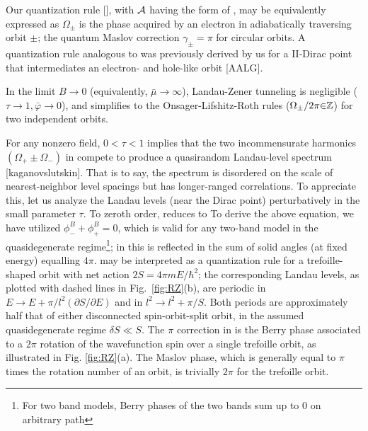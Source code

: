 \documentclass[aps, prb, showpacs, twocolumn, notitlepage, superscriptaddress]{revtex4-1}
\begin{document}
Our quantization rule [], with ${\cal A}$ having the form of , may be equivalently expressed as
$\Omega_{\pm}$ is the phase acquired by an electron in adiabatically traversing orbit $\pm$; the quantum Maslov correction $\gamma_{\pm}{=}\pi$ for circular orbits.  A quantization rule analogous to  was previously derived by us for a II-Dirac point that intermediates an electron- and hole-like orbit [AALG]. 


In the limit $B{\rightarrow}0$ (equivalently, $\bar{\mu}{\rightarrow} \infty$), Landau-Zener tunneling is negligible ($\tau{\rightarrow}1,\bar{\varphi}{\rightarrow}0$), and  simplifies to the Onsager-Lifshitz-Roth rules ($\Omega_{\pm}/2\pi{\in}\mathbb{Z}$) for  two independent orbits.

For any nonzero field, $0{<}\tau{<}1$ implies that the two incommensurate harmonics $(\Omega_+{\pm}\Omega_-)$ in  compete to produce a quasirandom Landau-level spectrum [kaganovslutskin]. That is to say, the spectrum is disordered on the scale of nearest-neighbor level spacings but has longer-ranged correlations. To appreciate this, let us analyze the Landau levels (near the Dirac point) perturbatively in the small parameter $\tau$. To zeroth order,  reduces to
To derive the above equation, we have utilized $\phi^B_-{+}\phi^B_+{=}0$, which is valid for any two-band model in the quasidegenerate regime\footnote{For two band models, Berry phases of the two bands sum up to 0 on arbitrary path}; in  this is reflected in the sum of solid angles (at fixed energy) equalling $4\pi$.  may be interpreted as a quantization rule for a trefoille-shaped orbit with net action $2S{=}4\pi m E{/\hbar^2}$; the corresponding Landau levels, as plotted with dashed lines in Fig.\ \ref{fig:RZ}(b), are  periodic in $E{\rightarrow}E{+}\pi/l^2(\partial S/\partial E)$ and in $l^2{\rightarrow}l^2{+}\pi/S$. Both periods are approximately half that of either disconnected spin-orbit-split orbit, in the assumed quasidegenerate regime $\delta S{\ll}S$. The $\pi$ correction in  is the Berry phase associated to a $2\pi$ rotation of the wavefunction spin over a single trefoille orbit, as illustrated in Fig. \ref{fig:RZ}(a). The Maslov phase, which is generally equal to $\pi$ times the rotation number of an orbit, is trivially $2\pi$ for the trefoille orbit.
\end{document}
